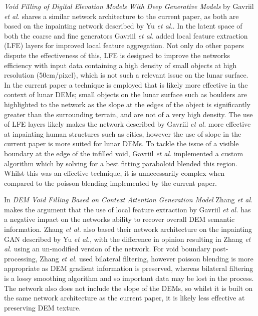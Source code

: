 \documentclass[twocolumn]{article}
\begin{document}
\emph{Void Filling of Digital Elevation Models With Deep Generative Models} by Gavriil \emph{et al.}\autocite{gavriilVoidFillingDigital2019} shares a similar network architecture to the current paper, as both are based on the inpainting network described by Yu \emph{et al.}\autocite{yuGenerativeImageInpainting2018}.
In the latent space of both the coarse and fine generators Gavriil \emph{et al.} added local feature extraction (LFE) layers for improved local feature aggregation.
Not only do other papers dispute the effectiveness of this\autocite{zhangVoidFillingBased2020}, LFE is designed to improve the networks efficiency with input data containing a high density of small objects at high resolution (50cm/pixel)\autocite{hamaguchiEffectiveUseDilated2018}, which is not such a relevant issue on the lunar surface.
In the current paper a technique is employed that is likely more effective in the context of lunar DEMs; small objects on the lunar surface such as boulders are highlighted to the network as the slope at the edges of the object is significantly greater than the surrounding terrain, and are not of a very high density.
The use of LFE layers likely makes the network described by Gavriil \emph{et al.} more effective at inpainting human structures such as cities, however the use of slope in the current paper is more suited for lunar DEMs.
To tackle the issue of a visible boundary at the edge of the infilled void, Gavriil \emph{et al.} implemented a custom algorithm which by solving for a best fitting paraboloid blended this region.
Whilst this was an effective technique, it is unnecessarily complex when compared to the poisson blending\autocite{perezPoissonImageEditing2003} implemented by the current paper.

In \emph{DEM Void Filling Based on Context Attention Generation Model} Zhang \emph{et al.}\autocite{zhangVoidFillingBased2020} makes the argument that the use of local feature extraction by Gavriil \emph{et al.}\autocite{gavriilVoidFillingDigital2019} has a negative impact on the networks ability to recover overall DEM semantic information.
Zhang \emph{et al.} also based their network architecture on the inpainting GAN described by Yu \emph{et al.}\autocite{yuGenerativeImageInpainting2018}, with the difference in opinion resulting in Zhang \emph{et al.} using an un-modified version of the network.
For void boundary post-processing,  Zhang \emph{et al.} used bilateral filtering, however poisson blending is more appropriate as DEM gradient information is preserved, whereas bilateral filtering is a lossy smoothing algorithm and so important data may be lost in the process.
The network also does not include the slope of the DEMs, so whilst it is built on the same network architecture as the current paper, it is likely less effective at preserving DEM texture.
\end{document}
